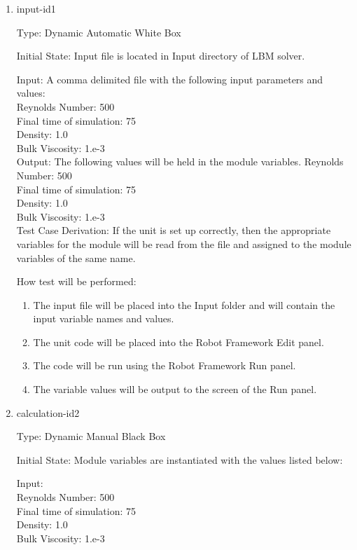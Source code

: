 \documentclass[12pt, titlepage]{article}
\begin{document}
\begin{enumerate}

\item{input-id1\\}

Type: Dynamic Automatic White Box
					
Initial State: Input file is located in Input directory of LBM solver.
					
Input: A comma delimited file with the following input parameters and values:\\
Reynolds Number: 500\\
Final time of simulation: 75\\
Density: 1.0\\
Bulk Viscosity: 1.e-3\\
					
Output: The following values will be held in the module variables.
Reynolds Number: 500\\
Final time of simulation: 75\\
Density: 1.0\\
Bulk Viscosity: 1.e-3\\

Test Case Derivation: If the unit is set up correctly, then the appropriate variables for the module will be read from the file and assigned to the module variables of the same name.

How test will be performed: 
\begin{enumerate}
\item The input file will be placed into the Input folder and will contain the input variable names and values.
\item The unit code will be placed into the Robot Framework Edit panel.
\item The code will be run using the Robot Framework Run panel.
\item The variable values will be output to the screen of the Run panel.
\end{enumerate}
					
\item{calculation-id2\\}

Type: Dynamic Manual Black Box
					
Initial State: Module variables are instantiated with the values listed below:
					
Input: \\
Reynolds Number: 500\\
Final time of simulation: 75\\
Density: 1.0\\
Bulk Viscosity: 1.e-3\\
					

\end{enumerate}
\end{document}
